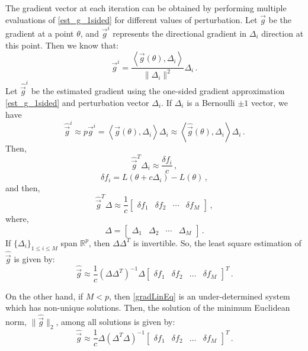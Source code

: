 The gradient vector at each iteration can be obtained by performing multiple evaluations of \eqref{est_g_1sided} for different values of perturbation. Let $\vec{g}$ be the gradient at a point $\theta$, and $\vec{g}^i$ represents the directional gradient in $\Delta_i$ direction at this point. Then we know that:
$$ \vec{g}^i = \frac{\left< \vec{g}(\theta), \Delta_i \right>}{\| \Delta_i \|^2} \Delta_i \,.$$
Let $\hat{\vec{g}}^i$ be the estimated gradient using the one-sided gradient approximation \eqref{est_g_1sided} and perturbation vector $\Delta_i$. If $\Delta_i$ is a Bernoulli $\pm 1$ vector, we have
$$ \hat{\vec{g}}^i \approx p \vec{g}^i = \left< \vec{g}(\theta), \Delta_i \right> \Delta_i \approx \left< \hat{\vec{g}}(\theta), \Delta_i \right> \Delta_i \,.$$
Then,
$$ \hat{\vec{g}}^T \Delta_i \approx \frac{\delta f_i}{c} \,,$$
$$ \delta f_i = L(\theta+c\Delta_i) - L(\theta)\,,$$
and then,
\begin{equation} \label{gradLinEq} 
\hat{\vec{g}}^T \Delta \approx \frac{1}{c} \begin{bmatrix} \delta f_1& \delta f_2& \cdots& \delta f_M \end{bmatrix}\,,
\end{equation}
where,
$$ \Delta = \begin{bmatrix} \Delta_1& \Delta_2& \cdots& \Delta_M \end{bmatrix}\,.$$
If $\{\Delta_i\}_{1\leq i\leq M}$ span $\mathbb{R}^p$, then $\Delta \Delta^T$ is invertible. So, the least square estimation of $\hat{\vec{g}}$ is given by:
\begin{equation} \label{MLS_grad}
\hat{\vec{g}} \approx \frac{1}{c} \left( \Delta \Delta^T \right)^{-1} \Delta \begin{bmatrix} \delta f_1 & \delta f_2 & \hdots & \delta f_M \end{bmatrix}^T\,.
\end{equation}

On the other hand, if $M<p$, then \eqref{gradLinEq} is an under-determined system which has non-unique solutions. Then, the solution of the minimum Euclidean norm, $\displaystyle \|\hat{\vec{g}}\|_{2}$, among all solutions is given by:
\begin{equation} \label{MN_grad}
\hat{\vec{g}} \approx \frac{1}{c} \Delta \left( \Delta^T \Delta \right)^{-1} \begin{bmatrix} \delta f_1 & \delta f_2 & \hdots & \delta f_M \end{bmatrix}^T\,.
\end{equation}


